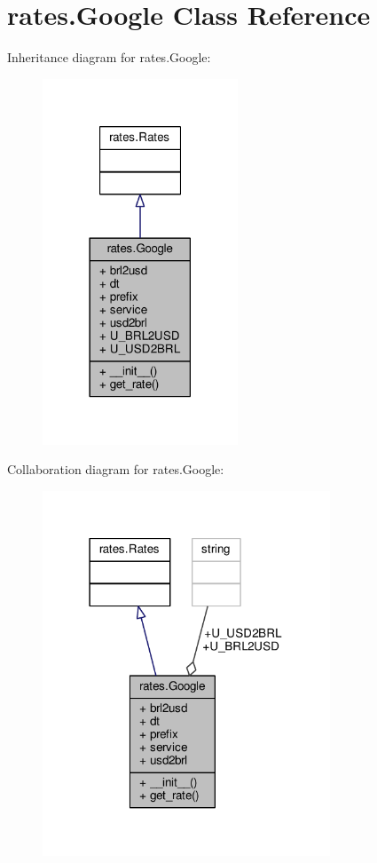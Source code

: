 \hypertarget{classrates_1_1_google}{}\section{rates.\+Google Class Reference}
\label{classrates_1_1_google}


Inheritance diagram for rates.\+Google\+:\nopagebreak
\begin{figure}[H]
\begin{center}
\leavevmode
\includegraphics[width=165pt]{classrates_1_1_google__inherit__graph}
\end{center}
\end{figure}


Collaboration diagram for rates.\+Google\+:\nopagebreak
\begin{figure}[H]
\begin{center}
\leavevmode
\includegraphics[width=243pt]{classrates_1_1_google__coll__graph}
\end{center}
\end{figure}
